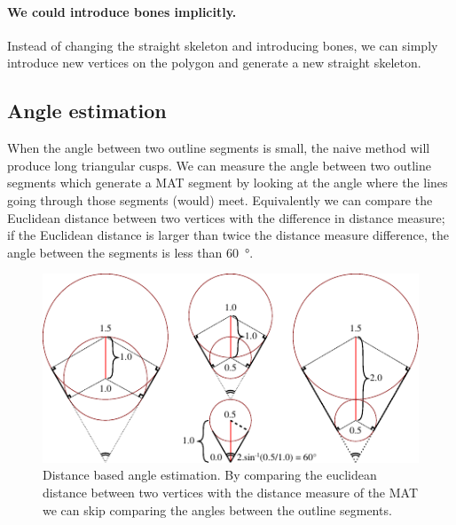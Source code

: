 \paragraph{We could introduce bones implicitly.}
Instead of changing the straight skeleton and introducing bones,
we can simply introduce new vertices on the polygon and generate a new straight skeleton.








\subsection{Angle estimation}
When the angle between two outline segments is small, the naive method will produce long triangular cusps.
We can measure the angle between two outline segments which generate a MAT segment by looking at the angle where the lines going through those segments (would) meet.
Equivalently we can compare the Euclidean distance between two vertices with the difference in distance measure;
if the Euclidean distance is larger than twice the distance measure difference, the angle between the segments is less than {\SI{60}{\degree}}.

\begin{figure}[H]
\centering
\includegraphics[width=.9\columnwidth]{sources/method/distance_based_angles.pdf}
\caption{Distance based angle estimation. By comparing the euclidean distance between two vertices with the distance measure of the MAT we can skip comparing the angles between the outline segments.}
\label{distance_based_angles}
\end{figure}

